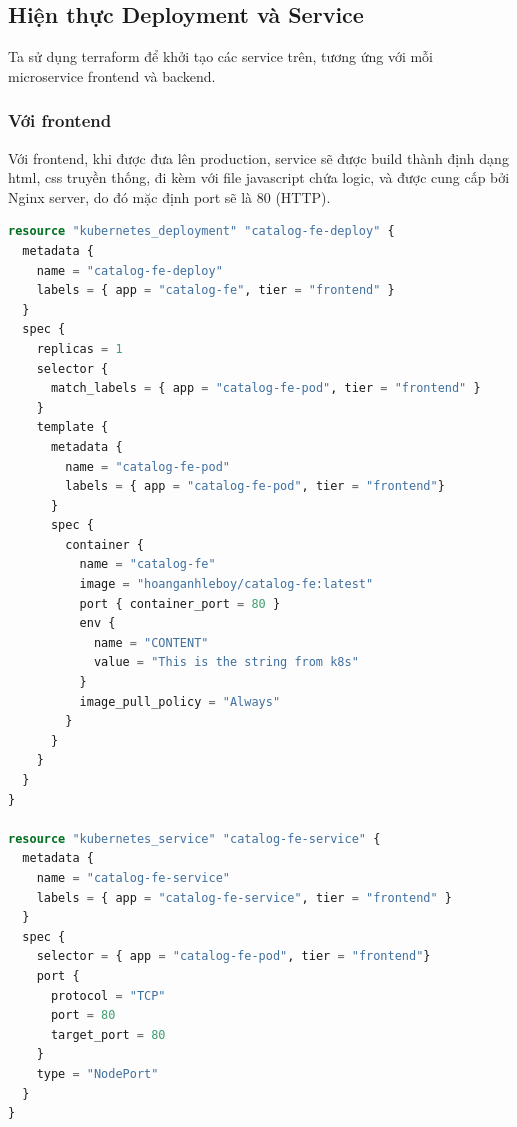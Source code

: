 \subsection{Hiện thực Deployment và Service}
\noindent Ta sử dụng terraform để khởi tạo các service trên, tương ứng với mỗi microservice frontend và backend.
\subsubsection{Với frontend}
\noindent Với frontend, khi được đưa lên production, service sẽ được build thành định dạng html, css truyền thống, đi kèm với file javascript chứa logic, và được cung cấp bởi Nginx server, do đó mặc định port sẽ là 80 (HTTP).
\begin{lstlisting}[language=terraform]
resource "kubernetes_deployment" "catalog-fe-deploy" {
  metadata {
    name = "catalog-fe-deploy"
    labels = { app = "catalog-fe", tier = "frontend" }
  }
  spec {
    replicas = 1
    selector {
      match_labels = { app = "catalog-fe-pod", tier = "frontend" }
    }
    template {
      metadata {
        name = "catalog-fe-pod"
        labels = { app = "catalog-fe-pod", tier = "frontend"}
      }
      spec {
        container {
          name = "catalog-fe"
          image = "hoanganhleboy/catalog-fe:latest"
          port { container_port = 80 }
          env {
            name = "CONTENT"
            value = "This is the string from k8s"
          }
          image_pull_policy = "Always"
        }
      }
    }
  }
}

resource "kubernetes_service" "catalog-fe-service" {
  metadata {
    name = "catalog-fe-service"
    labels = { app = "catalog-fe-service", tier = "frontend" }
  }
  spec {
    selector = { app = "catalog-fe-pod", tier = "frontend"}
    port {
      protocol = "TCP"
      port = 80
      target_port = 80
    }
    type = "NodePort"
  }
}
\end{lstlisting} 
